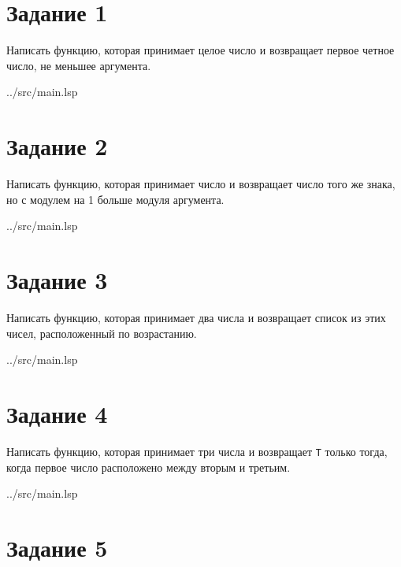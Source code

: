 \section*{Задание 1}

Написать функцию, которая принимает целое число и возвращает первое четное число, не меньшее аргумента.

\begin{lstinputlisting}[
	caption={Задание 1},
	label={lst:t1},
	style={lsp},
	linerange={1-4},
	]{../src/main.lsp}
\end{lstinputlisting}

\section*{Задание 2}

Написать функцию, которая принимает число и возвращает число того же знака, но с модулем на 1 больше модуля аргумента.

\begin{lstinputlisting}[
	caption={Задание 2},
	label={lst:t2},
	style={lsp},
	linerange={6-9},
	]{../src/main.lsp}
\end{lstinputlisting}

\section*{Задание 3}

Написать функцию, которая принимает два числа и возвращает список из этих чисел, расположенный по возрастанию.

\begin{lstinputlisting}[
	caption={Задание 3},
	label={lst:t3},
	style={lsp},
	linerange={11-12},
	]{../src/main.lsp}
\end{lstinputlisting}

\section*{Задание 4}

Написать функцию, которая принимает три числа и возвращает \texttt{Т} только тогда, когда первое число расположено между вторым и третьим.

\begin{lstinputlisting}[
	caption={Задание 4},
	label={lst:t4},
	style={lsp},
	linerange={14-17},
	]{../src/main.lsp}
\end{lstinputlisting}

\section*{Задание 5}

